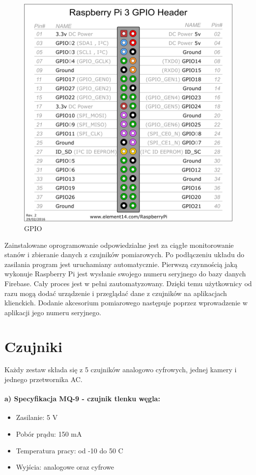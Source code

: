 \begin{figure}[h]
\begin{minipage}[b]{0.4\textwidth}
    \includegraphics[width=\textwidth]{gpio.png}
    \caption{GPIO}
  \end{minipage}
\end{figure}
Zainstalowane oprogramowanie odpowiedzialne jest za ciągłe monitorowanie stanów i zbieranie danych z czujników pomiarowych. Po podłączeniu układu do zasilania program jest uruchamiany automatycznie. Pierwszą czynnością jaką wykonuje Raspberry Pi jest wysłanie swojego numeru seryjnego do bazy danych Firebase. Cały proces jest w pełni zautomatyzowany. Dzięki temu użytkownicy od razu mogą dodać urządzenie i przeglądać dane z czujników na aplikacjach klienckich. Dodanie akcesorium pomiarowego następuje poprzez wprowadzenie w aplikacji jego numeru seryjnego.
\section*{Czujniki}
Każdy zestaw składa się z 5 czujników analogowo cyfrowych,  jednej kamery i jednego przetwornika AC. 
\paragraph{a) Specyfikacja MQ-9 - czujnik tlenku węgla:}
\begin{itemize} 
\item Zasilanie: 5 V
\item Pobór prądu: 150 mA
\item Temperatura pracy: od -10 do 50 \textdegree{}C
\item Wyjścia: analogowe oraz cyfrowe
\end{itemize}

